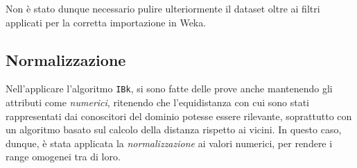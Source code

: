Non è stato dunque necessario pulire ulteriormente il dataset oltre ai filtri applicati per la corretta importazione in Weka.

\subsection{Normalizzazione}

Nell'applicare l'algoritmo \texttt{IBk}, si sono fatte delle prove anche mantenendo gli attributi come \emph{numerici},
ritenendo che l'equidistanza con cui sono stati rappresentati dai conoscitori del dominio potesse essere rilevante,
soprattutto con un algoritmo basato sul calcolo della distanza rispetto ai vicini.
In questo caso, dunque, è stata applicata la \emph{normalizzazione} ai valori numerici, per rendere i range omogenei tra di loro.

